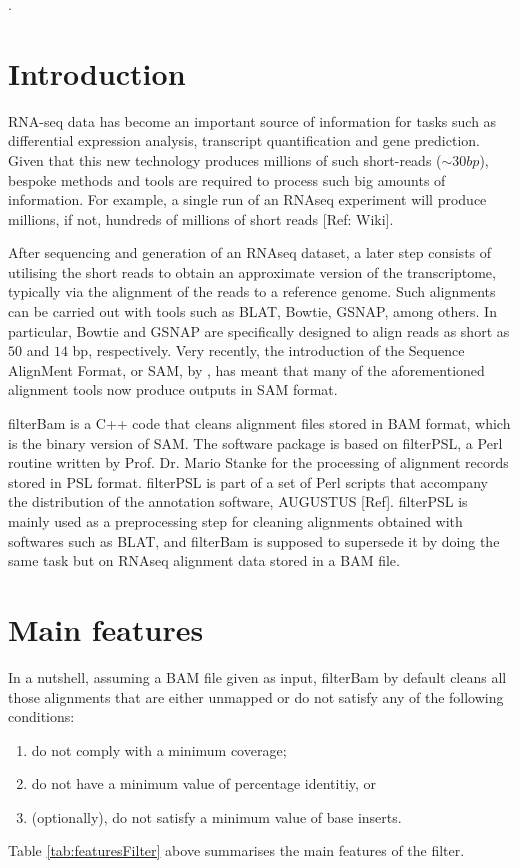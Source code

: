 \documentclass[11pt]{article}
\begin{document}
{. 

\section{Introduction}
RNA-seq data has become an important source of information for tasks such as differential 
expression analysis, transcript quantification and gene prediction. Given that this new technology 
produces millions of such short-reads ($\sim30bp$), bespoke methods and tools are required to process such big 
amounts of information. For example, a single run of an RNAseq experiment will produce millions, if not, 
hundreds of millions of short reads [Ref: Wiki].

After sequencing and generation of an RNAseq dataset, a later step consists of utilising the short 
reads to obtain an approximate 
version of the transcriptome, typically via the alignment of the reads to a reference genome. 
Such alignments can be carried out with tools such as BLAT, Bowtie, GSNAP, among others. In particular, 
Bowtie and GSNAP are specifically designed to align reads as short as $50$ and $14$ bp, respectively. 
Very recently, the introduction of the Sequence AlignMent Format, or SAM, by \citet{heng09:SAM}, has meant 
that many of the aforementioned alignment tools now produce outputs in SAM format. 

filterBam is a C++ code that cleans alignment files stored in BAM format, which is the binary version of 
SAM. The software package is based on filterPSL, a Perl routine written by Prof. Dr. Mario Stanke for the processing of 
alignment records stored in PSL format. filterPSL is part of a set of Perl scripts that accompany the 
distribution of the annotation software, AUGUSTUS [Ref]. filterPSL is mainly used as a preprocessing step 
for cleaning alignments obtained with softwares such as BLAT, and filterBam is supposed to supersede 
it by doing the same task but on RNAseq alignment data stored in a BAM file. 

\section{Main features}

In a nutshell, assuming a BAM file given as input, filterBam by default cleans all those alignments that are either unmapped or do not satisfy any of the following conditions:  
\begin{enumerate}
	\item	do not comply with a minimum coverage;
	\item	do not have a minimum value of percentage identitiy, or 
	\item	(optionally), do not satisfy a minimum value of base inserts. 
\end{enumerate} 
Table \ref{tab:featuresFilter} above summarises the main features of the filter. 

}
\end{document}
